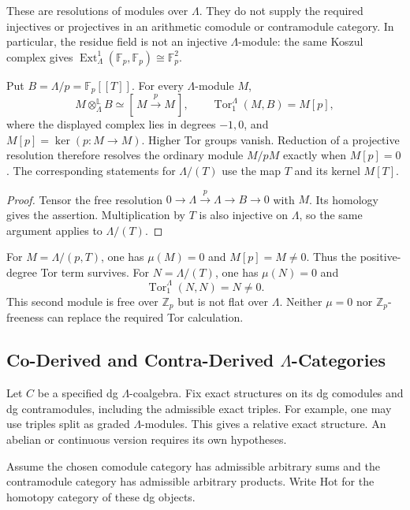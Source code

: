 These are resolutions of modules over \(\Lambda\).
They do not supply the required injectives or projectives in
an arithmetic comodule or contramodule category.
In particular, the residue field is not an injective
\(\Lambda\)-module: the same Koszul complex gives
\(\operatorname{Ext}^1_\Lambda(\mathbb F_p,\mathbb F_p)
\cong\mathbb F_p^2\).

\begin{proposition}
\label{v4-arith:pos:prop:resolutions-cohere}
Put \(B=\Lambda/p=\mathbb F_p[[T]]\).
For every \(\Lambda\)-module \(M\),
\[
 M\otimes_\Lambda^{\mathbb L}B
 \simeq[\,M\xrightarrow{p}M\,],
 \qquad
 \operatorname{Tor}_1^\Lambda(M,B)=M[p],
\]
where the displayed complex lies in degrees \(-1,0\), and
\(M[p]=\ker(p:M\to M)\). Higher Tor groups vanish.
Reduction of a projective resolution therefore resolves the
ordinary module \(M/pM\) exactly when \(M[p]=0\).
The corresponding statements for \(\Lambda/(T)\) use the
map \(T\) and its kernel \(M[T]\).
\end{proposition}
\begin{proof}
Tensor the free resolution
\(0\to\Lambda\xrightarrow{p}\Lambda\to B\to0\) with \(M\).
Its homology gives the assertion. Multiplication by \(T\) is
also injective on \(\Lambda\), so the same argument applies
to \(\Lambda/(T)\).
\end{proof}

For \(M=\Lambda/(p,T)\), one has \(\mu(M)=0\) and
\(M[p]=M\ne0\). Thus the positive-degree Tor term survives.
For \(N=\Lambda/(T)\), one has \(\mu(N)=0\) and
\[
 \operatorname{Tor}_1^\Lambda(N,N)=N\ne0.
\]
This second module is free over \(\mathbb Z_p\) but is not
flat over \(\Lambda\). Neither \(\mu=0\) nor
\(\mathbb Z_p\)-freeness can replace the required Tor calculation.

\subsection{Co-Derived and Contra-Derived \texorpdfstring{\(\Lambda\)}{Lambda}-Categories}
\label{v4-arith:pos:co-contra-lambda}

Let \(C\) be a specified dg \(\Lambda\)-coalgebra.
Fix exact structures on its dg comodules and dg contramodules,
including the admissible exact triples.
For example, one may use triples split as graded
\(\Lambda\)-modules. This gives a relative exact structure.
An abelian or continuous version requires its own hypotheses.

Assume the chosen comodule category has admissible arbitrary
sums and the contramodule category has admissible arbitrary
products. Write \(\mathrm{Hot}\) for the homotopy category
of these dg objects.

